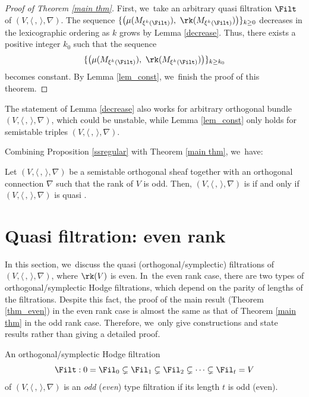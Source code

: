 \begin{proof}[Proof of Theorem \ref{main thm}]
First, we~take an arbitrary quasi \grsemistable filtration $\Filt$ of $(V,\langle \,, \, \rangle,\nabla)$.
The sequence $\{\big(\mu(M_{\xi^k(\Filt)}),\ \rk(M_{\xi^k(\Filt)})\big)\}_{k\geq 0}$ decreases in the lexicographic ordering as $k$ grows by Lemma \ref{decrease}.
Thus, there exists a positive integer $k_0$ such that the sequence
\[
\{\big(\mu(M_{\xi^k(\Filt)}),\ \rk(M_{\xi^k(\Filt)})\big)\}_{k\geq k_0}
\]
becomes constant.
By Lemma \ref{lem_const}, we~finish the proof of this theorem.
\end{proof}

\begin{rem}
The statement of Lemma \ref{decrease} also works for arbitrary orthogonal bundle $(V, \langle \,, \, \rangle, \nabla)$, which could be unstable, while Lemma \ref{lem_const} only holds for semistable triples $(V, \langle \,, \, \rangle, \nabla)$.
\end{rem}

Combining Proposition \ref{ssregular} with Theorem \ref{main thm}, we~have:

\begin{thm}\label{thm_gr_and_quasi_gr_odd}
Let $(V,\langle \,, \, \rangle,\nabla)$ be a semistable orthogonal sheaf together with an orthogonal connection $\nabla$ such that the rank of $V$ is odd. Then, $(V,\langle \,, \, \rangle,\nabla)$ is \grsemistable if and only if $(V,\langle \,, \, \rangle,\nabla)$ is quasi \grsemistable.
\end{thm}

\section{Quasi \texorpdfstring{\protect\grsemistable}{grsemistable} filtration: even rank}\label{sect_even}
In this section, we~discuss the quasi \grsemistable (orthogonal/symplectic) filtrations of $(V, \langle \,, \, \rangle, \nabla)$, where $\rk(V)$ is even. In~the even rank case, there are two types of orthogonal/symplectic Hodge filtrations, which depend on the parity of lengths of the filtrations. Despite this fact, the proof of the main result (Theorem \ref{thm_even}) in the even rank case is almost the same as that of Theorem \ref{main thm} in the odd rank case. Therefore, we~only give constructions and state results rather than giving a detailed proof.

\begin{defn}
An orthogonal/symplectic Hodge filtration
\[
\Filt: 0=\Fil_0\subsetneq \Fil_1 \subsetneq \Fil_2 \subsetneq \cdots\subsetneq \Fil_t=V
\]
of $(V, \langle \,, \, \rangle, \nabla)$ is an \emph{odd} (\resp \emph{even}) type filtration if its length $t$ is odd (\resp even).
\end{defn}

